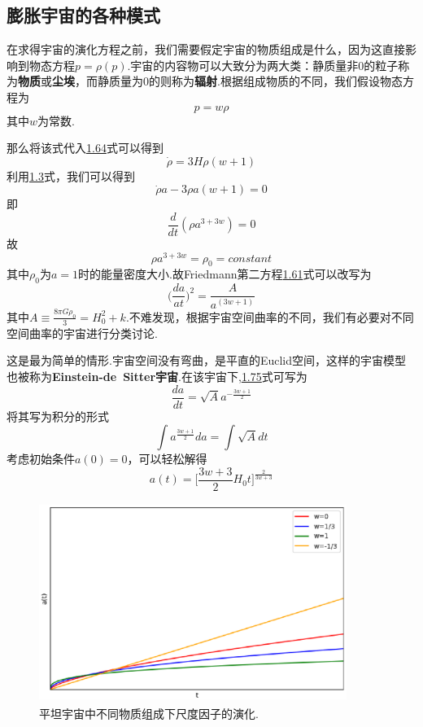 \documentclass[a4paper]{book}
\begin{document}
\subsection{膨胀宇宙的各种模式}
在求得宇宙的演化方程之前，我们需要假定宇宙的物质组成是什么，因为这直接影响到物态方程$p=\rho(p)$.宇宙的内容物可以大致分为两大类：静质量非0的粒子称为\textbf{物质}或\textbf{尘埃}，而静质量为0的则称为\textbf{辐射}.根据组成物质的不同，我们假设物态方程为
\begin{equation}
	p=w\rho
\end{equation}
其中$w$为常数.\par 那么将该式代入\hyperref[1.64]{1.64}式可以得到
\begin{equation}
	\dot{\rho}=3H\rho(w+1)
\end{equation}
利用\hyperref[1.3]{1.3}式，我们可以得到
\begin{equation}
	\dot{\rho}a-3\rho a(w+1)=0
\end{equation}
即
\begin{equation}
	\frac{d}{dt}(\rho a^{3+3w})=0
\end{equation}
故
\begin{equation}\label{1.74}
	\rho a^{3+3w}=\rho_0=constant
\end{equation}
其中$\rho_0$为$a=1$时的能量密度大小.故Friedmann第二方程\hyperref[1.61]{1.61}式可以改写为
\begin{equation}\label{1.75}
	\Big(\frac{da}{at}\Big)^2=\frac{A}{a^(3w+1)}
\end{equation}
其中$A\equiv \frac{8\pi G\rho_0}{3}=H_0^2+k$.不难发现，根据宇宙空间曲率的不同，我们有必要对不同空间曲率的宇宙进行分类讨论.\par
{}
这是最为简单的情形.宇宙空间没有弯曲，是平直的Euclid空间，这样的宇宙模型也被称为\textbf{Einstein-de~Sitter宇宙}.在该宇宙下,\hyperref[1.75]{1.75}式可写为
\begin{equation}
	\frac{da}{dt}=\sqrt{A}a^{-\frac{3w+1}{2}}
\end{equation}
将其写为积分的形式
\begin{equation}
	\int a^{\frac{3w+1}{2}}da=\int \sqrt{A}dt
\end{equation}
考虑初始条件$a(0)=0$，可以轻松解得
\begin{equation}
	a(t)=\Big[\frac{3w+3}{2}H_0t\Big]^{\frac{2}{3w+3}}
\end{equation}
\begin{figure}[!h]
	\centering
	\includegraphics[width=10cm,height=6.5cm]{figures/k=0.eps}
	\caption{平坦宇宙中不同物质组成下尺度因子的演化.}
\end{figure}\par
\end{document}
